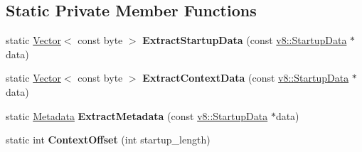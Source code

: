\subsection*{Static Private Member Functions}
\begin{DoxyCompactItemize}
\item 
static \hyperlink{classv8_1_1internal_1_1_vector}{Vector}$<$ const byte $>$ {\bfseries Extract\+Startup\+Data} (const \hyperlink{classv8_1_1_startup_data}{v8\+::\+Startup\+Data} $\ast$data)\hypertarget{classv8_1_1internal_1_1_snapshot_aee9cc1943fd871b4eeac9ad5f9cb4d3b}{}\label{classv8_1_1internal_1_1_snapshot_aee9cc1943fd871b4eeac9ad5f9cb4d3b}

\item 
static \hyperlink{classv8_1_1internal_1_1_vector}{Vector}$<$ const byte $>$ {\bfseries Extract\+Context\+Data} (const \hyperlink{classv8_1_1_startup_data}{v8\+::\+Startup\+Data} $\ast$data)\hypertarget{classv8_1_1internal_1_1_snapshot_adfaeac0fabe215418e6874b1078dc7ce}{}\label{classv8_1_1internal_1_1_snapshot_adfaeac0fabe215418e6874b1078dc7ce}

\item 
static \hyperlink{classv8_1_1internal_1_1_snapshot_1_1_metadata}{Metadata} {\bfseries Extract\+Metadata} (const \hyperlink{classv8_1_1_startup_data}{v8\+::\+Startup\+Data} $\ast$data)\hypertarget{classv8_1_1internal_1_1_snapshot_a45e725d71d24c2562aec4af1b9254fd4}{}\label{classv8_1_1internal_1_1_snapshot_a45e725d71d24c2562aec4af1b9254fd4}

\item 
static int {\bfseries Context\+Offset} (int startup\+\_\+length)\hypertarget{classv8_1_1internal_1_1_snapshot_a39270475f42beb07da0732484879f1c0}{}\label{classv8_1_1internal_1_1_snapshot_a39270475f42beb07da0732484879f1c0}

\end{DoxyCompactItemize}

